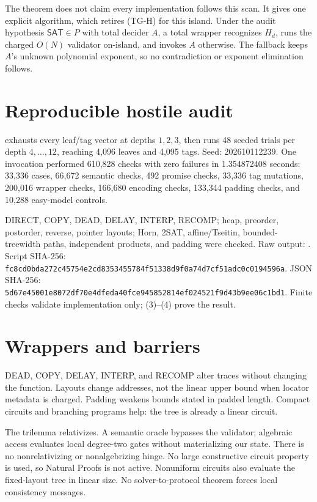 \documentclass[11pt]{article}
\newcommand{\SAT}{\mathsf{SAT}}
\begin{document}
The theorem does not claim every implementation follows this scan.  It gives
one explicit algorithm, which retires (TG-H) for this island.  Under the audit
hypothesis \(\SAT\in P\) with total decider \(A\), a total wrapper recognizes
\(H_d\), runs the charged \(O(N)\) validator on-island, and invokes \(A\)
otherwise.  The fallback keeps \(A\)'s unknown polynomial exponent, so no
contradiction or exponent elimination follows.

\section{Reproducible hostile audit}

 exhausts every
leaf/tag vector at depths \(1,2,3\), then runs 48 seeded trials per depth
\(4,\ldots,12\), reaching 4,096 leaves and 4,095 tags.  Seed:
202610112239.  One invocation performed 610,828 checks with zero failures in
1.354872408 seconds: 33,336 cases, 66,672 semantic checks, 492 promise checks,
33,336 tag mutations, 200,016 wrapper checks, 166,680 encoding checks,
133,344 padding checks, and 10,288 easy-model controls.

DIRECT, COPY, DEAD, DELAY, INTERP, RECOMP; heap, preorder, postorder, reverse,
pointer layouts; Horn, 2SAT, affine/Tseitin, bounded-treewidth paths,
independent products, and padding were checked.  Raw output:
.
Script SHA-256:
\texttt{fc8cd0bda272c45754e2cd8353455784f51338d9f0a74d7cf51adc0c0194596a}.
JSON SHA-256:
\texttt{5d67e45001e8072df70e4dfeda40fce945852814ef024521f9d43b9ee06c1bd1}.
Finite checks validate implementation only; (3)--(4) prove the result.

\section{Wrappers and barriers}

DEAD, COPY, DELAY, INTERP, and RECOMP alter traces without changing the
function.  Layouts change addresses, not the linear upper bound when locator
metadata is charged.  Padding weakens bounds stated in padded length.  Compact
circuits and branching programs help: the tree is already a linear circuit.

The trilemma relativizes.  A semantic oracle bypasses the validator; algebraic
access evaluates local degree-two gates without materializing our state.
There is no nonrelativizing or nonalgebrizing hinge.  No large constructive
circuit property is used, so Natural Proofs is not active.  Nonuniform
circuits also evaluate the fixed-layout tree in linear size.  No
solver-to-protocol theorem forces local consistency messages.
\end{document}
